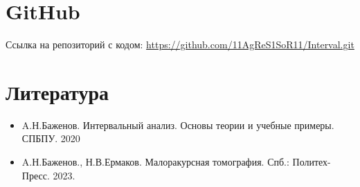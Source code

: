 \documentclass[a4paper,12pt]{article}
\begin{document}
\section{GitHub}
Ссылка на репозиторий с кодом: \url{https://github.com/11AgReS1SoR11/Interval.git} \\

\section{Литература}
\begin{itemize}
    \item A.Н.Баженов. Интервальный анализ. Основы теории и учебные примеры. СПБПУ. 2020
    \item A.Н.Баженов., Н.В.Ермаков. Малоракурсная томография. Спб.: Политех-Пресс. 2023.  
\end{itemize}
\end{document}
